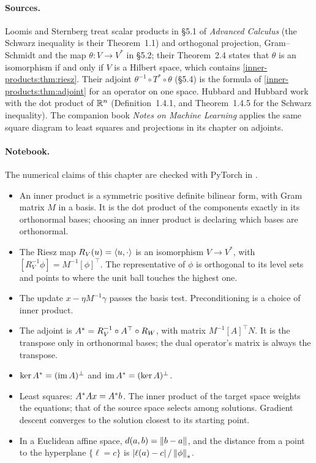 \begin{notechapter}
\paragraph{Sources.} Loomis and Sternberg treat scalar products in \S5.1
of \emph{Advanced Calculus} (the Schwarz inequality is their Theorem~1.1)
and orthogonal projection, Gram--Schmidt and the map
$\theta:V\to V^*$ in \S5.2; their Theorem~2.4 states that $\theta$ is an
isomorphism if and only if $V$ is a Hilbert space, which contains
\cref{inner-products:thm:riesz}. Their adjoint
$\theta^{-1}\circ T^*\circ\theta$ (\S5.4) is the formula of
\cref{inner-products:thm:adjoint} for an operator on one space. Hubbard and
Hubbard work with the dot product of $\mathbb{R}^n$ (Definition~1.4.1, and
Theorem~1.4.5 for the Schwarz inequality). The companion book \emph{Notes
on Machine Learning} applies the same square diagram to least squares and
projections in its chapter on adjoints.

\paragraph{Notebook.} The numerical claims of this chapter are checked
with PyTorch in .

\begin{chaptersummary}
\begin{itemize}[nosep]
  \item An inner product is a symmetric positive definite bilinear form,
        with Gram matrix $M$ in a basis. It is the dot product of the
        components exactly in its orthonormal bases; choosing an inner
        product is declaring which bases are orthonormal.
  \item The Riesz map $R_V(u) = \left\langle u, \cdot \right\rangle$ is an isomorphism
        $V\to V^*$, with $[R_V^{-1}\phi] = M^{-1}[\phi]^\top$. The
        representative of $\phi$ is orthogonal to its level sets and
        points to where the unit ball touches the highest one.
  \item The update $x - \eta M^{-1}\gamma$ passes the basis test.
        Preconditioning is a choice of inner product.
  \item The adjoint is $A^{*} = R_V^{-1}\circ A^{\top}\circ R_W$, with
        matrix $M^{-1}[A]^\top N$. It is the transpose only in orthonormal
        bases; the dual operator's matrix is always the transpose.
  \item $\ker A^{*} = (\operatorname{im} A)^\perp$ and $\operatorname{im}A^{*} = (\ker A)^\perp$.
  \item Least squares: $A^{*}Ax = A^{*}b$. The inner product of the
        target space weights the equations; that of the source space
        selects among solutions. Gradient descent converges to the
        solution closest to its starting point.
  \item In a Euclidean affine space, $d(a, b) = \left\|b - a\right\|$, and the
        distance from a point to the hyperplane $\{\ell = c\}$ is
        $\left|\ell(a) - c\right|/\left\|\phi\right\|_*$.
\end{itemize}
\end{chaptersummary}


\end{notechapter}
